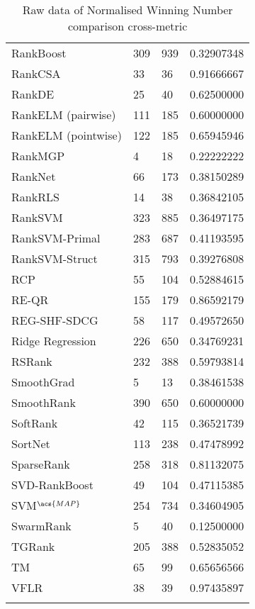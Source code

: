 \begin{longtable}{l|l|l|l}
RankBoost & 309 & 939 & 0.32907348 \\ 
RankCSA & 33 & 36 & 0.91666667 \\ 
RankDE & 25 & 40 & 0.62500000 \\ 
RankELM (pairwise) & 111 & 185 & 0.60000000 \\ 
RankELM (pointwise) & 122 & 185 & 0.65945946 \\ 
RankMGP & 4 & 18 & 0.22222222 \\ 
RankNet & 66 & 173 & 0.38150289 \\ 
Rank\acs{RLS} & 14 & 38 & 0.36842105 \\ 
Rank\acs{SVM} & 323 & 885 & 0.36497175 \\ 
Rank\acs{SVM}-Primal & 283 & 687 & 0.41193595 \\ 
Rank\acs{SVM}-Struct & 315 & 793 & 0.39276808 \\ 
RCP & 55 & 104 & 0.52884615 \\ 
RE-QR & 155 & 179 & 0.86592179 \\ 
REG-SHF-SDCG & 58 & 117 & 0.49572650 \\ 
Ridge Regression & 226 & 650 & 0.34769231 \\ 
RSRank & 232 & 388 & 0.59793814 \\ 
SmoothGrad & 5 & 13 & 0.38461538 \\ 
SmoothRank & 390 & 650 & 0.60000000 \\ 
SoftRank & 42 & 115 & 0.36521739 \\ 
SortNet & 113 & 238 & 0.47478992 \\ 
SparseRank & 258 & 318 & 0.81132075 \\ 
\acs{SVD}-RankBoost & 49 & 104 & 0.47115385 \\ 
\acs{SVM}$^{\acs{MAP}}$ & 254 & 734 & 0.34604905 \\ 
SwarmRank & 5 & 40 & 0.12500000 \\ 
TGRank & 205 & 388 & 0.52835052 \\ 
TM & 65 & 99 & 0.65656566 \\ 
VFLR & 38 & 39 & 0.97435897 \\
\caption{Raw data of Normalised Winning Number comparison cross-metric}
\label{tab:raw_data_norm_winnum}
\end{longtable}
